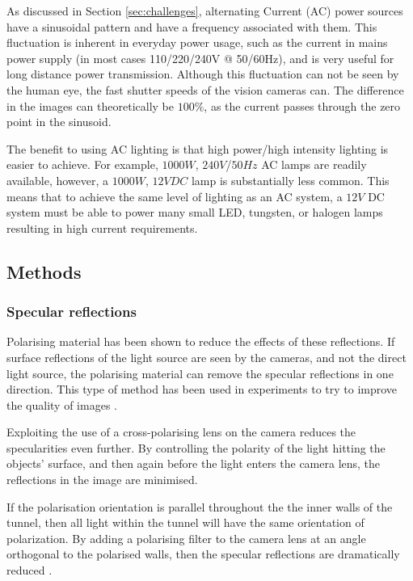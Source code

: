 \documentclass[fleqn,twoside]{article}
\begin{document}
As discussed in Section \ref{sec:challenges}, alternating Current (AC) power sources have a sinusoidal pattern and have a frequency associated with them. This fluctuation is inherent in everyday power usage, such as the current in mains power supply (in most cases 110/220/240V @ 50/60Hz), and is very useful for long distance power transmission. Although this fluctuation can not be seen by the human eye, the fast shutter speeds of the vision cameras can. The difference in the images can theoretically be $100\%$, as the current passes through the zero point in the sinusoid.

The benefit to using AC lighting is that high power/high intensity lighting is easier to achieve. For example, $1000W$, $240V$/$50Hz$ AC lamps are readily available, however, a $1000W$, $12VDC$ lamp is substantially less common. This means that to achieve the same level of lighting as an AC system, a $12V$ DC system must be able to power many small LED, tungsten, or halogen lamps resulting in high current requirements.  


\subsection{Methods}

\subsubsection{Specular reflections}

Polarising material has been shown to reduce the effects of these reflections. If surface reflections of the light source are seen by the cameras, and not the direct light source, the polarising material can remove the specular reflections in one direction. This type of method has been used in experiments to try to improve the quality of images \cite{atkinson, wolff}.

Exploiting the use of a cross-polarising lens on the camera reduces the specularities even further. By controlling the polarity of the light hitting the objects' surface, and then again before the light enters the camera lens, the reflections in the image are minimised.

If the polarisation orientation is parallel throughout the the inner walls of the tunnel, then all light within the tunnel will have the same orientation of polarization. By adding a polarising filter to the camera lens at an angle orthogonal to the polarised walls, then the specular reflections are dramatically reduced \cite{anderson, kuranov}.
\end{document}
